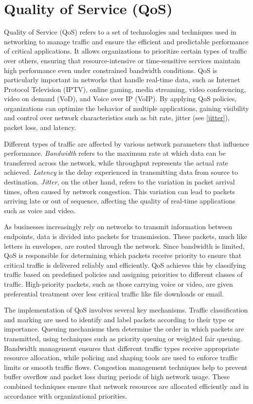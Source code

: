 \section{Quality of Service (QoS)}

Quality of Service (QoS) refers to a set of technologies and techniques used in networking to manage traffic and ensure the efficient and predictable performance of critical applications. It allows organizations to prioritize certain types of traffic over others, ensuring that resource-intensive or time-sensitive services maintain high performance even under constrained bandwidth conditions. QoS is particularly important in networks that handle real-time data, such as Internet Protocol Television (IPTV), online gaming, media streaming, video conferencing, video on demand (VoD), and Voice over IP (VoIP). By applying QoS policies, organizations can optimize the behavior of multiple applications, gaining visibility and control over network characteristics such as bit rate, jitter (see \ref{jitter}), packet loss, and latency.

Different types of traffic are affected by various network parameters that influence performance. \textit{Bandwidth} refers to the maximum rate at which data can be transferred across the network, while throughput represents the actual rate achieved. \textit{Latency} is the delay experienced in transmitting data from source to destination. \textit{Jitter}, on the other hand, refers to the variation in packet arrival times, often caused by network congestion. This variation can lead to packets arriving late or out of sequence, affecting the quality of real-time applications such as voice and video.\label{jitter}

As businesses increasingly rely on networks to transmit information between endpoints, data is divided into packets for transmission. These packets, much like letters in envelopes, are routed through the network. Since bandwidth is limited, QoS is responsible for determining which packets receive priority to ensure that critical traffic is delivered reliably and efficiently. QoS achieves this by classifying traffic based on predefined policies and assigning priorities to different classes of traffic. High-priority packets, such as those carrying voice or video, are given preferential treatment over less critical traffic like file downloads or email.

The implementation of QoS involves several key mechanisms. Traffic classification and marking are used to identify and label packets according to their type or importance. Queuing mechanisms then determine the order in which packets are transmitted, using techniques such as priority queuing or weighted fair queuing. Bandwidth management ensures that different traffic types receive appropriate resource allocation, while policing and shaping tools are used to enforce traffic limits or smooth traffic flows. Congestion management techniques help to prevent buffer overflow and packet loss during periods of high network usage. These combined techniques ensure that network resources are allocated efficiently and in accordance with organizational priorities.

